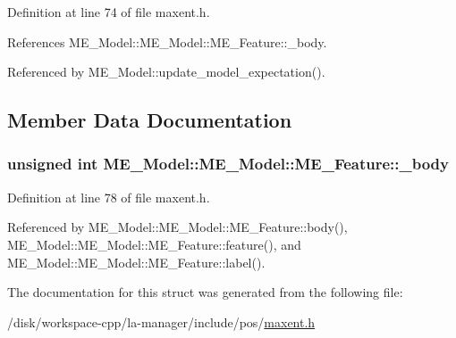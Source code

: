 Definition at line 74 of file maxent.h.

References ME\_\-Model::ME\_\-Model::ME\_\-Feature::\_\-body.

Referenced by ME\_\-Model::update\_\-model\_\-expectation().

\subsection{Member Data Documentation}
\hypertarget{structME__Model_1_1ME__Feature_23b671df1acedf1260ec775d4ac0a8c7}{
\subsubsection[{\_\-body}]{\setlength{\rightskip}{0pt plus 5cm}unsigned int ME\_\-Model::ME\_\-Model::ME\_\-Feature::\_\-body}}
\label{structME__Model_1_1ME__Feature_23b671df1acedf1260ec775d4ac0a8c7}




Definition at line 78 of file maxent.h.

Referenced by ME\_\-Model::ME\_\-Model::ME\_\-Feature::body(), ME\_\-Model::ME\_\-Model::ME\_\-Feature::feature(), and ME\_\-Model::ME\_\-Model::ME\_\-Feature::label().

The documentation for this struct was generated from the following file:\begin{CompactItemize}
\item 
/disk/workspace-cpp/la-manager/include/pos/\hyperlink{maxent_8h}{maxent.h}\end{CompactItemize}
